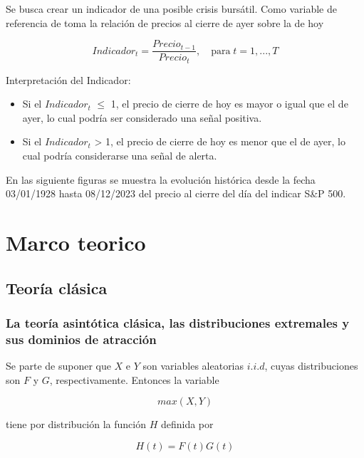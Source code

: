 \documentclass[
  oneside]{article}
\begin{document}
Se busca crear un indicador de una posible crisis bursátil. Como
variable de referencia de toma la relación de precios al cierre de ayer
sobre la de hoy

\begin{equation}
Indicador_t=\frac{Precio_{t-1}}{Precio_t},\quad\text{para}\; t=1,...,T \label{eq:ind}
\end{equation} \vspace{0.5cm}

Interpretación del Indicador:

\begin{itemize}
\item Si el $Indicador_t$    $\leq$ 1, el precio de cierre de hoy es mayor o igual que el de ayer, lo cual podría ser considerado una señal positiva.
\item Si el $Indicador_t$ > 1, el precio de cierre de hoy es menor que el de ayer, lo cual podría considerarse una señal de alerta.
\end{itemize}

\newpage

En las siguiente figuras se muestra la evolución histórica desde la
fecha 03/01/1928 hasta 08/12/2023 del precio al cierre del día del
indicar S\&P 500.

\newpage

\section{Marco teorico}

\subsection{Teoría clásica}
\subsubsection{La teoría asintótica clásica, las distribuciones extremales y sus dominios de atracción}

Se parte de suponer que \(X\) e \(Y\) son variables aleatorias
\(i.i.d\), cuyas distribuciones son \(F\) y \(G\), respectivamente.
Entonces la variable

\begin{equation}
max(X,Y)
\end{equation}

tiene por distribución la función \(H\) definida por

\begin{equation}
H(t)= F(t) G(t)
\end{equation}
\end{document}
